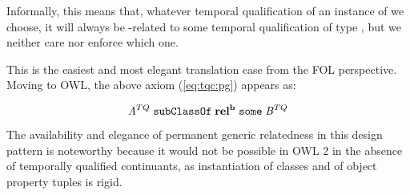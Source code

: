Informally, this means that, whatever temporal qualification of an instance of
 we choose, it will always be -related to some temporal
qualification of type , but we neither care nor enforce which one.

This is the easiest and most elegant translation case from the FOL perspective.
Moving to OWL, the above axiom (\ref{eq:tqc:pg}) appears as:

\begin{equation}
\mathit{A}^{TQ}\;\mathtt{subClassOf}\;\mathrm{\mathbf{rel^b}}\;\mathtt{some}\;\mathit{B}^{TQ}
\label{eq:tqc:pg:owl}
\end{equation}



The availability and elegance of permanent generic relatedness in this design pattern is noteworthy because
it would not be possible in OWL 2 in the absence of temporally qualified
continuants, as instantiation of classes and of object property
tuples is rigid. %

